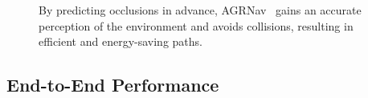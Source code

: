 \begin{figure}[!t]
    
    \centering
    
    \caption{By predicting occlusions in advance, AGRNav~\cite{agrnav} gains an accurate perception of the environment and avoids collisions, resulting in efficient and energy-saving paths.}
    \label{fig:agrnav}
\end{figure}


\subsection{End-to-End Performance}

